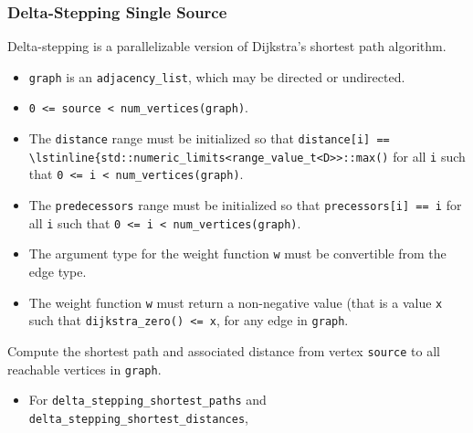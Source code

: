 \subsubsection{Delta-Stepping Single Source}

{\small
      
}


\begin{itemdescr}
      \pnum Delta-stepping is a parallelizable version of Dijkstra's shortest path algorithm.
      \pnum\preconditions
      \begin{itemize}
            \item
                  \lstinline{graph} is an \lstinline{adjacency_list}, which may be directed or
                  undirected.
            \item
                  \lstinline{0 <= source < num_vertices(graph)}.
            \item
                  The \lstinline{distance} range must be initialized so that
                  \lstinline{distance[i] == \lstinline{std::numeric_limits<range_value_t<D>>::max()}
                  for all \lstinline{i}
                  such that \lstinline{0 <= i < num_vertices(graph)}.  
            \item
                  The \lstinline{predecessors} range must be initialized so that
                  \lstinline{precessors[i] == i} for all \lstinline{i} such that
                  \lstinline{0 <= i < num_vertices(graph)}.
      \end{itemize}
      \pnum\requires
      \begin{itemize}
            \item
                  The argument type for the weight
                  function \lstinline{w} must be convertible from the edge type.
            \item
                  The weight function \lstinline{w} must return a non-negative value (that is
                  a value \lstinline{x} such that \lstinline{dijkstra_zero() <= x},
                  for any edge in \lstinline{graph}.
      \end{itemize}
      \pnum\effects Compute the shortest path and associated distance from vertex
      \lstinline{source} to all reachable vertices in \lstinline{graph}.
      \pnum\returns
      \begin{itemize}
            \item For \lstinline{delta_stepping_shortest_paths} and \lstinline{delta_stepping_shortest_distances},

\end{itemize}
\end{itemdescr}
